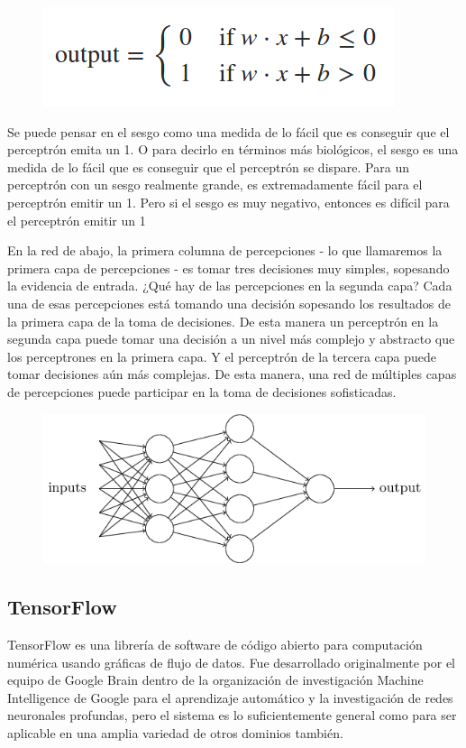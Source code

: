    \begin{figure}[ht]
	\centering
	\includegraphics[width=0.30\linewidth]{figuras/perceptron_formula_2.png}
	\label{qvalue}
\end{figure}
 
Se puede pensar en el sesgo como una medida de lo fácil que es conseguir que el perceptrón emita un 1. O para decirlo en términos más biológicos, el sesgo es una medida de lo fácil que es conseguir que el perceptrón se dispare. Para un perceptrón con un sesgo realmente grande, es extremadamente fácil para el perceptrón emitir un 1. Pero si el sesgo es muy negativo, entonces es difícil para el perceptrón emitir un 1
 
 En la red de abajo, la primera columna de percepciones - lo que llamaremos la primera capa de percepciones - es tomar tres decisiones muy simples, sopesando la evidencia de entrada. ¿Qué hay de las percepciones en la segunda capa? Cada una de esas percepciones está tomando una decisión sopesando los resultados de la primera capa de la toma de decisiones. De esta manera un perceptrón en la segunda capa puede tomar una decisión a un nivel más complejo y abstracto que los perceptrones en la primera capa. Y el perceptrón de la tercera capa puede tomar decisiones aún más complejas. De esta manera, una red de múltiples capas de percepciones puede participar en la toma de decisiones sofisticadas.
 
\begin{figure}[ht]
	\centering
	\includegraphics[width=0.30\linewidth]{figuras/net.png}
	\label{qvalue}
\end{figure}


\subsection{TensorFlow}

TensorFlow es una librería de software de código abierto para computación numérica usando gráficas de flujo de datos. Fue desarrollado originalmente por el equipo de Google Brain dentro de la organización de investigación Machine Intelligence de Google para el aprendizaje automático y la investigación de redes neuronales profundas, pero el sistema es lo suficientemente general como para ser aplicable en una amplia variedad de otros dominios también.

